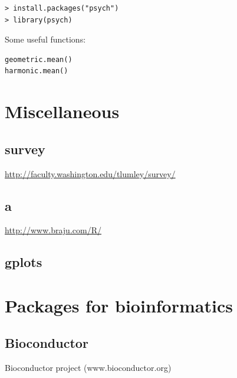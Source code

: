 \begin{lstlisting}
> install.packages("psych")
> library(psych)
\end{lstlisting}

Some useful functions:
\begin{lstlisting}
geometric.mean()
harmonic.mean()
\end{lstlisting}




\section{Miscellaneous}
\label{sec:miscellaneous}

\subsection{survey}
\label{sec:survey}

\url{http://faculty.washington.edu/tlumley/survey/}

\subsection{a}


\url{http://www.braju.com/R/}

\subsection{gplots}
\label{sec:gplots}


\section{Packages for bioinformatics}
\label{sec:pack-bioinf}

\subsection{Bioconductor}
\label{sec:bioconductor}

Bioconductor project (www.bioconductor.org)
